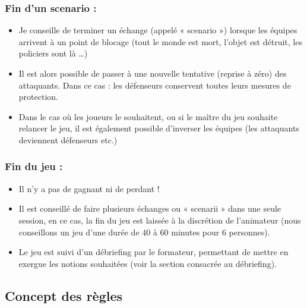 \documentclass[11pt]{article} %
\begin{document}
\subsubsection{Fin d'un scenario :}
\begin{itemize}
\item Je conseille de terminer un échange (appelé « scenario ») lorsque les
équipes arrivent à un point de blocage (tout le monde est mort, l'objet est
détruit, les policiers sont là …)
\item Il est alors possible de passer à une nouvelle tentative (reprise à zéro)
des attaquants. Dans ce cas : les défenseurs conservent toutes leurs mesures de
protection.
\item Dans le cas où les joueurs le souhaitent, ou si le maître du jeu souhaite
relancer le jeu, il est également possible d'inverser les équipes (les
attaquants deviennent défenseurs etc.)
\end{itemize}

\subsubsection{Fin du jeu :}
\begin{itemize}
    \item Il n'y a pas de gagnant ni de perdant ! 
\item Il est conseillé de faire plusieurs échanges ou « scenarii » dans une
seule session, en ce cas, la fin du jeu est laissée à la discrétion de
l'animateur (nous conseillons un jeu d'une durée de 40 à 60 minutes pour 6
personnes).
\item Le jeu est suivi d'un débriefing par le formateur, permettant de mettre en
exergue les notions souhaitées (voir la section consacrée au débriefing).
\end{itemize}
	
\subsection{Concept des règles}
\end{document}
